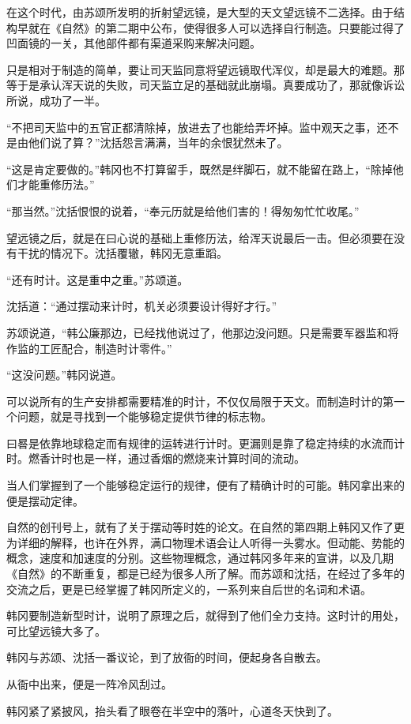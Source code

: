 在这个时代，由苏颂所发明的折射望远镜，是大型的天文望远镜不二选择。由于结构早就在《自然》的第二期中公布，使得很多人可以选择自行制造。只要能过得了凹面镜的一关，其他部件都有渠道采购来解决问题。

只是相对于制造的简单，要让司天监同意将望远镜取代浑仪，却是最大的难题。那等于是承认浑天说的失败，司天监立足的基础就此崩塌。真要成功了，那就像诉讼所说，成功了一半。

“不把司天监中的五官正都清除掉，放进去了也能给弄坏掉。监中观天之事，还不是由他们说了算？”沈括怨言满满，当年的余恨犹然未了。

“这是肯定要做的。”韩冈也不打算留手，既然是绊脚石，就不能留在路上，“除掉他们才能重修历法。”

“那当然。”沈括恨恨的说着，“奉元历就是给他们害的！得匆匆忙忙收尾。”

望远镜之后，就是在曰心说的基础上重修历法，给浑天说最后一击。但必须要在没有干扰的情况下。沈括覆辙，韩冈无意重蹈。

“还有时计。这是重中之重。”苏颂道。

沈括道：“通过摆动来计时，机关必须要设计得好才行。”

苏颂说道，“韩公廉那边，已经找他说过了，他那边没问题。只是需要军器监和将作监的工匠配合，制造时计零件。”

“这没问题。”韩冈说道。

可以说所有的生产安排都需要精准的时计，不仅仅局限于天文。而制造时计的第一个问题，就是寻找到一个能够稳定提供节律的标志物。

曰晷是依靠地球稳定而有规律的运转进行计时。更漏则是靠了稳定持续的水流而计时。燃香计时也是一样，通过香烟的燃烧来计算时间的流动。

当人们掌握到了一个能够稳定运行的规律，便有了精确计时的可能。韩冈拿出来的便是摆动定律。

自然的创刊号上，就有了关于摆动等时姓的论文。在自然的第四期上韩冈又作了更为详细的解释，也许在外界，满口物理术语会让人听得一头雾水。但动能、势能的概念，速度和加速度的分别。这些物理概念，通过韩冈多年来的宣讲，以及几期《自然》的不断重复，都是已经为很多人所了解。而苏颂和沈括，在经过了多年的交流之后，更是已经掌握了韩冈所定义的，一系列来自后世的名词和术语。

韩冈要制造新型时计，说明了原理之后，就得到了他们全力支持。这时计的用处，可比望远镜大多了。

韩冈与苏颂、沈括一番议论，到了放衙的时间，便起身各自散去。

从衙中出来，便是一阵冷风刮过。

韩冈紧了紧披风，抬头看了眼卷在半空中的落叶，心道冬天快到了。


